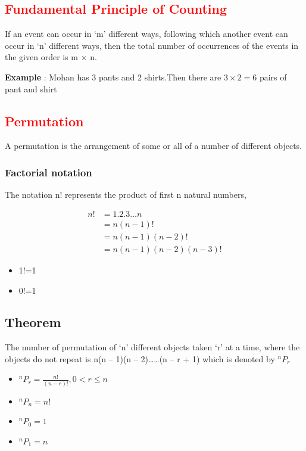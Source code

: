 \documentclass{article}
\begin{document}
\begin{multicols}{2}

\subsection*{\textcolor{red}{Fundamental Principle of Counting}}
If an event can occur in ‘m’ different ways, following which another event can occur in ‘n’ different ways, then the total number of occurrences of the events in the given order is m × n.

\textbf{Example }:
Mohan has 3 pants and 2 shirts.Then there are $3 \times 2=6 $ pairs of pant and shirt

\subsection*{\large \textbf{\textcolor{red}{Permutation}}}
A permutation is the arrangement of some or all of a number of different objects.

\subsubsection*{Factorial notation}
The notation n! represents the product of first n natural numbers,


   \begin{align*}
   n!&=1.2.3\dots n\\
     &=n(n-1)!\\
    &=n(n-1)(n-2)!\\
    &=n(n-1)(n-2)(n-3)!   
    \end{align*} 
    
\begin{itemize}

    \item 1!=1
    \item 0!=1
\end{itemize}

\subsection*{Theorem}
The number of permutation of ‘n’ different objects taken ‘r’ at a time, where the objects do not repeat is n(n – 1)(n – 2)……(n – r + 1) which is denoted by $^nP_r$
\begin{itemize}
    \item $^nP_r=\frac{n!}{(n-r)!},0<r\leq n$ 
    \item $^nP_n=n!$
    \item $^nP_0=1$
    \item $^nP_1=n$
\end{itemize}


\end{multicols}
\end{document}

